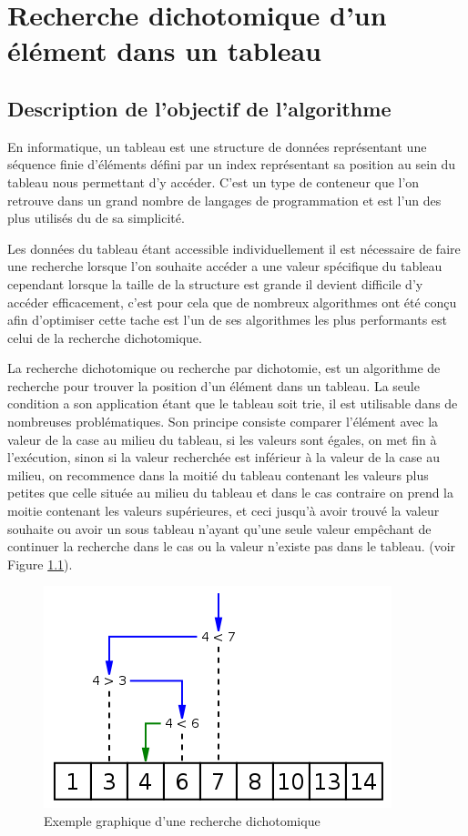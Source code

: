 \chapter{Recherche dichotomique d'un élément dans un tableau}

\section{Description de l'objectif de l'algorithme}
En informatique, un tableau est une structure de données représentant une séquence finie d'éléments défini par un index représentant sa position au sein du tableau nous permettant d'y accéder. C'est un type de conteneur que l'on retrouve dans un grand nombre de langages de programmation et est l'un des plus utilisés du de sa simplicité.
\par
Les données du tableau étant accessible individuellement il est nécessaire de faire une recherche lorsque l'on souhaite accéder a une valeur spécifique du tableau cependant lorsque la taille de la structure est grande il devient difficile d'y accéder efficacement, c'est pour cela que de nombreux algorithmes ont été conçu afin d'optimiser cette tache est l'un de ses algorithmes les plus performants est celui de la recherche dichotomique.
\par
La recherche dichotomique ou recherche par dichotomie, est un algorithme de recherche pour trouver la position d'un élément dans un tableau. La seule condition a son application étant que le tableau soit trie, il est utilisable dans de nombreuses problématiques. Son principe consiste comparer l'élément avec la valeur de la case au milieu du tableau, si les valeurs sont égales, on met fin à l'exécution, sinon si la valeur recherchée est inférieur à la valeur de la case au milieu, on recommence dans la moitié du tableau contenant les valeurs plus petites que celle située au milieu du tableau et dans le cas contraire on prend la moitie contenant les valeurs supérieures, et ceci jusqu'à avoir trouvé la valeur souhaite ou avoir un sous tableau n'ayant qu'une seule valeur empêchant de continuer la recherche dans le cas ou la valeur n'existe pas dans le tableau. (voir Figure \ref{fig:exp_dico}).

\begin{figure}[H]
    \centering
        \includegraphics[scale=1.0]{./ressources/Binary_search_into_array.png}
        \caption{Exemple graphique d'une recherche dichotomique}
    \label{fig:exp_dico}
\end{figure}

